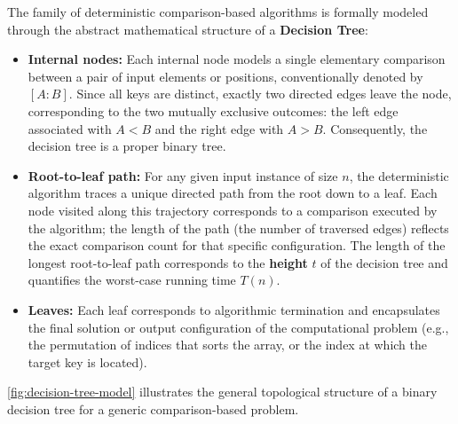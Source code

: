 The family of deterministic comparison-based algorithms is formally modeled through the abstract mathematical structure of a \textbf{Decision Tree}:

\begin{itemize}
  \item \textbf{Internal nodes:} Each internal node models a single elementary comparison between a pair of input elements or positions, conventionally denoted by $[A : B]$. Since all keys are distinct, exactly two directed edges leave the node, corresponding to the two mutually exclusive outcomes: the left edge associated with $A < B$ and the right edge with $A > B$. Consequently, the decision tree is a proper binary tree.
  \item \textbf{Root-to-leaf path:} For any given input instance of size $n$, the deterministic algorithm traces a unique directed path from the root down to a leaf. Each node visited along this trajectory corresponds to a comparison executed by the algorithm; the length of the path (the number of traversed edges) reflects the exact comparison count for that specific configuration. The length of the longest root-to-leaf path corresponds to the \textbf{height} $t$ of the decision tree and quantifies the worst-case running time $T(n)$.
  \item \textbf{Leaves:} Each leaf corresponds to algorithmic termination and encapsulates the final solution or output configuration of the computational problem (e.g., the permutation of indices that sorts the array, or the index at which the target key is located).
\end{itemize}

\autoref{fig:decision-tree-model} illustrates the general topological structure of a binary decision tree for a generic comparison-based problem.

